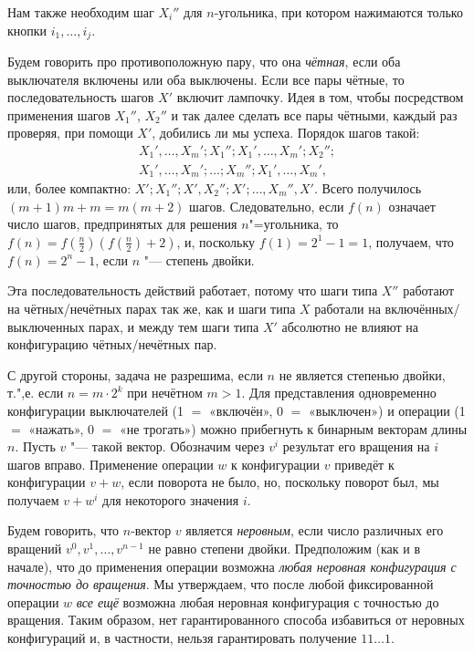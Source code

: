 \documentclass[twoside]{book}
\begin{document}
Нам также необходим шаг $X_i''$ для $n$-угольника, при котором нажимаются только кнопки $i_1,\dots,i_j$.

Будем говорить про противоположную пару, что она \emph{чётная}, если оба выключателя включены или оба выключены.
Если все пары чётные, то последовательность шагов $X'$ включит лампочку.
Идея в том, чтобы посредством применения шагов $X_1''$, $X_2''$ и так далее сделать все пары чётными, каждый раз проверяя, при помощи $X'$, добились ли мы успеха.
Порядок шагов такой:
\begin{align*}
X_1',\dots,X_m';X_1'';X_1',\dots,X_m';X_2'';
\\
X_1',\dots,X_m';\dots ; X_m'';X_1',\dots,X_m',
\end{align*}
или, более компактно: $X';X_1'';X',X_2'';X';\dots,X_m'',X'$.
Всего получилось $(m+1)m+m=m(m+2)$ шагов.
Следовательно, если $f(n)$ означает число шагов, предпринятых для решения $n$"=угольника, то 
$f(n)=f(\tfrac n2)(f(\tfrac n2)+2)$,
и, поскольку $f(1)=2^1-1=1$, получаем, что $f(n)=2^n-1$, если $n$ "--- степень двойки. %

Эта последовательность действий работает, потому что шаги типа $X''$ работают на чётных/нечётных парах так же, как и шаги типа $X$ работали на включённых/выключенных парах, и между тем шаги типа $X'$ абсолютно не влияют на конфигурацию чётных/нечётных пар.
\heart

С другой стороны, задача не разрешима, если $n$ не является степенью двойки, т.",е. если $n=m\cdot 2^k$ при нечётном $m>1$.
Для представления одновременно конфигурации выключателей (1 $=$ «включён», 0 $=$ «выключен») и операции (1 $=$ «нажать», 0 $=$ «не трогать») можно прибегнуть к бинарным векторам длины $n$.
Пусть $v$ "--- такой вектор.
Обозначим через $v^i$ результат его вращения на $i$ шагов вправо.
Применение операции $w$ к конфигурации $v$ приведёт к конфигурации $v+w$, если поворота не было, но, поскольку поворот был, мы получаем $v+w^i$ для некоторого значения $i$.

Будем говорить, что $n$-вектор $v$ является \emph{неровным}, %
если число различных его вращений $v^0,v^1,\dots,v^{n-1}$ не равно степени двойки.
Предположим (как и в начале), что до применения операции возможна \emph{любая неровная конфигурация с точностью до вращения}.
Мы утверждаем, что после любой фиксированной операции $w$ \emph{все ещё} возможна любая неровная конфигурация с точностью до вращения.
Таким образом, нет гарантированного способа избавиться от неровных конфигураций и, в частности, нельзя гарантировать получение $11\dots1$.
\end{document}
